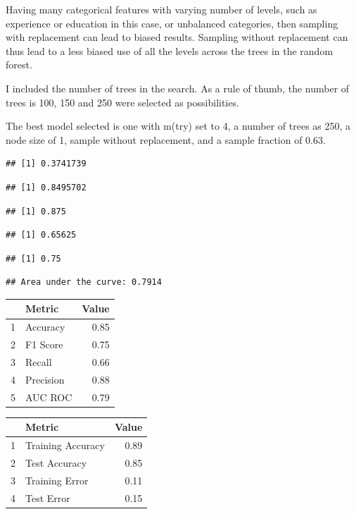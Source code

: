 \documentclass[11pt,preprint, authoryear]{elsarticle}
\let\origtable\table
\let\endorigtable\endtable
\renewenvironment{table}[1][2] {
    \expandafter\origtable\expandafter[H]
} {
    \endorigtable
}
\numberwithin{equation}{section}
\numberwithin{figure}{section}
\numberwithin{table}{section}
\begin{document}
Having many categorical features with varying number of levels, such as
experience or education in this case, or unbalanced categories, then
sampling with replacement can lead to biased results. Sampling without
replacement can thus lead to a less biased use of all the levels across
the trees in the random forest.

I included the number of trees in the search. As a rule of thumb, the
number of trees is 100, 150 and 250 were selected as possibilities.

The best model selected is one with m(try) set to 4, a number of trees
as 250, a node size of 1, sample without replacement, and a sample
fraction of 0.63.

\begin{verbatim}
## [1] 0.3741739
\end{verbatim}

\begin{verbatim}
## [1] 0.8495702
\end{verbatim}

\begin{verbatim}
## [1] 0.875
\end{verbatim}

\begin{verbatim}
## [1] 0.65625
\end{verbatim}

\begin{verbatim}
## [1] 0.75
\end{verbatim}

\begin{verbatim}
## Area under the curve: 0.7914
\end{verbatim}

\begin{table}[H]
\centering
\begin{tabular}{rlr}
  \hline
 & Metric & Value \\ 
  \hline
1 & Accuracy & 0.85 \\ 
  2 & F1 Score & 0.75 \\ 
  3 & Recall & 0.66 \\ 
  4 & Precision & 0.88 \\ 
  5 & AUC ROC & 0.79 \\ 
   \hline
\end{tabular}
\caption{Metrics for Tuned Random Forest \label{tab1}} 
\end{table}

\begin{table}[H]
\centering
\begin{tabular}{rlr}
  \hline
 & Metric & Value \\ 
  \hline
1 & Training Accuracy & 0.89 \\ 
  2 & Test Accuracy & 0.85 \\ 
  3 & Training Error & 0.11 \\ 
  4 & Test Error & 0.15 \\ 
   \hline
\end{tabular}
\caption{More Metrics for Tuned Random Forest \label{tab1}} 
\end{table}
\end{document}
